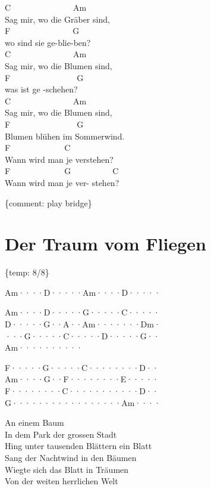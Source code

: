 \documentclass[
  letterpaper,
  twoside=false]{scrbook}
\begin{document}
C~~~~~~~~~~~~~~~Am~~~~~~~~~~~\\
Sag mir, wo die Gräber sind,\\
F~~~~~~~~~~~~~~~G\\
wo sind sie ge-blie-ben?\\
C~~~~~~~~~~~~~~~Am~~~~~~~~~~~\\
Sag mir, wo die Blumen sind,\\
F~~~~~~~~~~~~~~~~G\\
was ist ge -schehen?\\
C~~~~~~~~~~~~~~~Am~~~~~~~~~~~\\
Sag mir, wo die Blumen sind,\\
F~~~~~~~~~~~~~~~~G\\
Blumen blühen im Sommerwind.\\
F~~~~~~~~~~~~~C~~~~~~~~~~~~~~~~~\\
Wann wird man je verstehen?~~~~~\\
F~~~~~~~~~~~~~G~~~~~~~~~~C\\
Wann wird man je ver- stehen?

\{comment: play bridge\}

\hypertarget{der-traum-vom-fliegen}{%
\chapter{Der Traum vom Fliegen}\label{der-traum-vom-fliegen}}

\{temp: 8/8\}

Am····\textbar D·····\textbar Am····\textbar D·····\textbar{}

Am····\textbar D·····\textbar G·····\textbar C·····\textbar{}\\
D·····\textbar G··A··\textbar Am····\textbar···Dm·\textbar{}\\
···G··\textbar···C··\textbar···D··\textbar···G··\textbar{}\\
Am····\textbar······\textbar{}

F·····\textbar G·····\textbar C·····\textbar···D··\textbar{}\\
Am····\textbar G··F··\textbar······\textbar E·····\textbar{}\\
F·····\textbar···C··\textbar······\textbar···D··\textbar{}\\
G·····\textbar······\textbar······\textbar Am····\textbar{}

An einem Baum\\
In dem Park der grossen Stadt\\
Hing unter tausenden Blättern ein Blatt\\
Sang der Nachtwind in den Bäumen\\
Wiegte sich das Blatt in Träumen\\
Von der weiten herrlichen Welt
\end{document}
